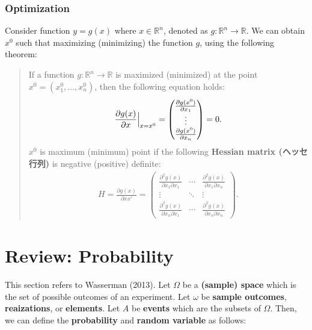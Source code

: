 \documentclass[
  12pt,
]{article}
\begin{document}
\hypertarget{optimization}{%
\subsubsection{Optimization}\label{optimization}}

Consider function \(y = g(x)\) where \(x \in \mathbb{R}^{n}\), denoted
as \(g: \mathbb{R}^{n} \to \mathbb{R}\). We can obtain \(x^0\) such that
maximizing (minimizing) the function \(g\), using the following theorem:

\begin{quote}
If a function \(g \colon \mathbb{R}^{n} \rightarrow \mathbb{R}\) is
maximized (minimized) at the point
\(x^{0} = (x_{1}^{0}, \ldots, x_{n}^{0})\), then the following equation
holds: \begin{align*}
\frac{\partial g (x)}{\partial x} \Big{\vert}_{x = x^{0}} 
= 
\begin{pmatrix}
\frac{\partial g (x^{0})}{\partial x_{1}} \\
\vdots \\
\frac{\partial g (x^{0})}{\partial x_{n}} 
\end{pmatrix}  
= 0.
\end{align*} \(x^0\) is maximum (minimum) point if the following
\textbf{Hessian matrix (ヘッセ行列)} is negative (positive) definite:
\begin{align*}
H = \frac{\partial g (x)}{\partial xx'} 
=
\begin{pmatrix}
\frac{\partial^{2} g (x)}{\partial x_{1} \partial x_{1}} 
& \cdots & \frac{\partial^{2} g (x)}{\partial x_{1} \partial x_{n}} \\
\vdots  &\ddots  &\vdots\\
\frac{\partial^{2} g (x)}{\partial x_{n} \partial x_{1}} 
& \cdots & \frac{\partial^{2} g (x)}{\partial x_{n} \partial x_{n}}
\end{pmatrix}.
\end{align*}
\end{quote}

\hypertarget{review-probability}{%
\section{Review: Probability}\label{review-probability}}

This section refers to Wasserman (2013). Let \(\Omega\) be a
\textbf{(sample) space} which is the set of possible outcomes of an
experiment. Let \(\omega\) be \textbf{sample outcomes},
\textbf{reaizations}, or \textbf{elements}. Let \(A\) be \textbf{events}
which are the subsets of \(\Omega\). Then, we can define the
\textbf{probability} and \textbf{random variable} as follows:
\end{document}
